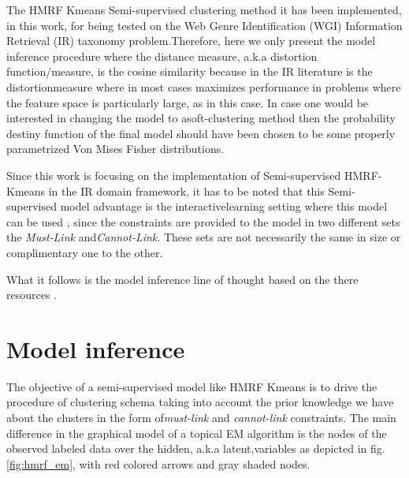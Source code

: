 \documentclass[dvips,dvipdfm,pdftex]{llncs}
\begin{document}
The HMRF Kmeans Semi-supervised clustering method it has been implemented, in this work, for being tested on the Web Genre Identification (WGI) Information Retrieval (IR) taxonomy problem.Therefore, here we only present the model inference procedure where the distance measure, a.k.a distortion function/measure, is the cosine similarity because in the IR literature is the distortionmeasure where in most cases maximizes performance in problems where the feature space is particularly large, as in this case. In case one would be interested in changing the model to asoft-clustering method then the probability destiny function of the final model should have been chosen to be some properly parametrized Von Mises Fisher distributions.

Since this work is focusing on the implementation of Semi-supervised HMRF-Kmeans in the IR domain framework, it has to be noted that this Semi-supervised model advantage is the interactivelearning setting where this model can be used \cite{chapelle2006semi_hmrf_kmeans}, since the constraints are provided to the model in two different sets the \emph{Must-Link} and\emph{Cannot-Link}. These sets are not necessarily the same in size or complimentary one to the other.

What it follows is the model inference line of thought based on the there resources \cite{basu2004probabilistic,chapelle2006semi_hmrf_kmeans,bishop2006_EM_general_view}.

\section{Model inference}\label{sec:model_inference}
The objective of a semi-supervised model like HMRF Kmeans is to drive the procedure of clustering schema taking into account the prior knowledge we have about the clusters in the form of\emph{must-link} and \emph{cannot-link} constraints. The main difference in the graphical model of a topical EM algorithm is the nodes of the observed labeled data over the hidden, a.k.a latent,variables as depicted in fig.\ref{fig:hmrf_em}, with red colored arrows and gray shaded nodes.
\end{document}
